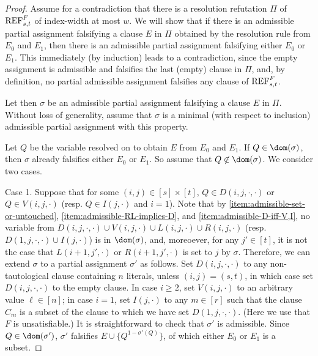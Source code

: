 \begin{proof}
Assume for a contradiction that there is a resolution refutation $\Pi$ of $\textnormal{REF}^{F}_{s,t}$ of index-width at most $w$. We will show that if there is an admissible partial assignment falsifying a clause $E$ in $\Pi$ obtained by the resolution rule from $E_0$ and $E_1$, then there is an admissible partial assignment falsifying either $E_0$ or $E_1$. This immediately (by induction) leads to a contradiction, since the empty assignment is admissible and falsifies the last (empty) clause in $\Pi$, and, by definition, no partial admissible assignment falsifies any clause of $\textnormal{REF}^{F}_{s,t}$.

Let then $\sigma$ be an admissible partial assignment falsifying a clause $E$ in $\Pi$. Without loss of generality, assume that $\sigma$ is a minimal (with respect to inclusion) admissible partial assignment with this property. 

Let $Q$ be the variable resolved on to obtain $E$ from $E_0$ and $E_1$. If $Q \in \dom(\sigma)$, then $\sigma$ already falsifies either $E_0$ or $E_1$. So assume that $Q \not \in \dom(\sigma)$.
We consider two cases.

Case 1. Suppose that for some $(i,j) \in [s] \times [t]$, $Q \in D(i,j,\cdot, \cdot)$ or $Q \in V(i,j,\cdot)$ (resp. $Q \in I(j,\cdot)$ and $i = 1$). Note that by \ref{item:admissible-set-or-untouched}, \ref{item:admissible-RL-implies-D}, and \ref{item:admissible-D-iff-V,I}, no variable from $D(i,j,\cdot, \cdot) \cup V(i,j,\cdot) \cup L(i,j,\cdot) \cup R(i,j,\cdot)$ (resp. $D(1,j,\cdot, \cdot) \cup I(j,\cdot)$) is in $\dom(\sigma)$, and, moreoever, for any $j' \in [t]$, it is not the case that $L(i+1,j',\cdot)$ or $R(i+1,j',\cdot)$ is set to $j$ by $\sigma$. Therefore, we can extend $\sigma$ to a partial assignment $\sigma'$ as follows. Set $D(i,j,\cdot, \cdot)$ to any non-tautological clause containing $n$ literals, unless $(i,j) = (s,t)$, in which case set $D(i,j,\cdot, \cdot)$ to the empty clause. In case $i \geq 2$, set $V(i,j,\cdot)$ to an arbitrary value $\ell \in [n]$; in case $i=1$, set $I(j,\cdot)$ to any $m \in [r]$ such that the clause $C_m$ is a subset of the clause to which we have set $D(1,j,\cdot, \cdot)$. (Here we use that $F$ is unsatisfiable.) It is straightforward to check that $\sigma'$ is admissible. Since $Q \in \dom(\sigma')$, $\sigma'$ falsifies $E \cup \{Q^{1-\sigma'(Q)}\}$, of which either $E_0$ or $E_1$ is a subset.   


\end{proof}
